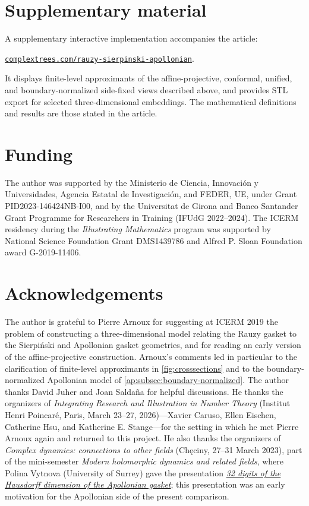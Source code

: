 \documentclass[11pt]{amsart}
\theoremstyle{definition}
\begin{document}
\section*{Supplementary material}
A supplementary interactive implementation accompanies the article:
\begin{center}
\href{https://complextrees.com/rauzy-sierpinski-apollonian}{\nolinkurl{complextrees.com/rauzy-sierpinski-apollonian}}.
\end{center}
It displays finite-level approximants of the affine-projective, conformal, unified, and boundary-normalized side-fixed views described above, and provides STL export for selected three-dimensional embeddings. The mathematical definitions and results are those stated in the article.


\section*{Funding}
The author was supported by the Ministerio de Ciencia, Innovaci\'on y Universidades, Agencia Estatal de Investigaci\'on, and FEDER, UE, under Grant PID2023-146424NB-I00, and by the Universitat de Girona and Banco Santander Grant Programme for Researchers in Training (IFUdG 2022--2024). The ICERM residency during the \emph{Illustrating Mathematics} program was supported by National Science Foundation Grant DMS1439786 and Alfred P. Sloan Foundation award G-2019-11406.

\section*{Acknowledgements}
The author is grateful to Pierre Arnoux for suggesting at ICERM 2019 the problem of constructing a three-dimensional model relating the Rauzy gasket to the Sierpi\'nski and Apollonian gasket geometries, and for reading an early version of the affine-projective construction. Arnoux's comments led in particular to the clarification of finite-level approximants in \cref{fig:crosssections} and to the boundary-normalized Apollonian model of \cref{ap:subsec:boundary-normalized}. The author thanks David Juher and Joan Salda\~na for helpful discussions. He thanks the organizers of \emph{Integrating Research and Illustration in Number Theory} (Institut Henri Poincar\'e, Paris, March 23--27, 2026)---Xavier Caruso, Ellen Eischen, Catherine Hsu, and Katherine E. Stange---for the setting in which he met Pierre Arnoux again and returned to this project. He also thanks the organizers of \emph{Complex dynamics: connections to other fields} (Ch\k{e}ciny, 27--31 March 2023), part of the mini-semester \emph{Modern holomorphic dynamics and related fields}, where Polina Vytnova (University of Surrey) gave the presentation \href{https://www.mimuw.edu.pl/~holdyn23/pages/presentations/presentation-Vytnova.pdf}{\emph{32 digits of the Hausdorff dimension of the Apollonian gasket}}; this presentation was an early motivation for the Apollonian side of the present comparison.



\end{document}
